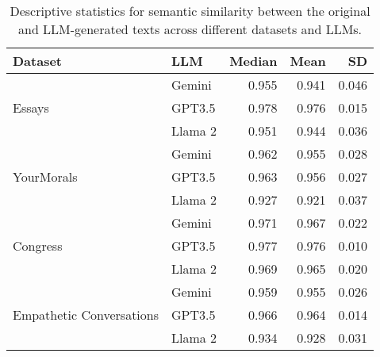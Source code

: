 \begin{table*}[ht]
\centering
\begin{tabular}{llrrr}

Dataset & LLM & Median & Mean & SD\\
\hline
 & Gemini & 0.955 & 0.941 & 0.046\\

Essays & GPT3.5 & 0.978 & 0.976 & 0.015\\

& Llama 2 & 0.951 & 0.944 & 0.036\\\hline

 & Gemini & 0.962 & 0.955 & 0.028\\

YourMorals & GPT3.5 & 0.963 & 0.956 & 0.027\\

& Llama 2 & 0.927 & 0.921 & 0.037\\\hline

 & Gemini & 0.971 & 0.967 & 0.022\\

Congress & GPT3.5 & 0.977 & 0.976 & 0.010\\

 & Llama 2 & 0.969 & 0.965 & 0.020\\
\hline
 & Gemini & 0.959 & 0.955 & 0.026\\

Empathetic Conversations & GPT3.5 & 0.966 & 0.964 & 0.014\\

& Llama 2 & 0.934 & 0.928 & 0.031\\
\hline
\end{tabular}
\caption{Descriptive statistics for semantic similarity between the original and LLM-generated texts across different datasets and LLMs.}
\label{tab:similarity_descriptive}
\end{table*}